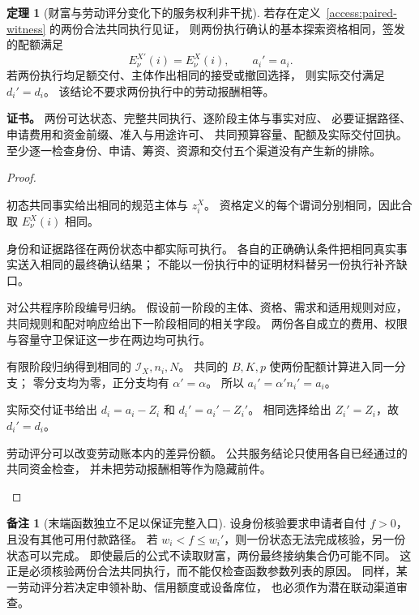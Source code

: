 \documentclass[UTF8,12pt,a4paper,openany,fontset=none,zihao=false]{ctexrep}
\theoremstyle{definition}
\newtheorem{theorem}{定理}[chapter]
\newtheorem{remark}{备注}[chapter]
\newenvironment{certificate}{\par\noindent\textbf{证书。}\ignorespaces}{\par}
\newcommand{\1}{\mathbf 1}
\begin{document}
\begin{theorem}[财富与劳动评分变化下的服务权利非干扰]
\label{access:noninterference}
若存在定义~\ref{access:paired-witness} 的两份合法共同执行见证，
则两份执行确认的基本探索资格相同，签发的配额满足
\[
E_\nu^{X\prime}(i)=E_\nu^X(i),\qquad a_i'=a_i.
\]
若两份执行均足额交付、主体作出相同的接受或撤回选择，
则实际交付满足 \(d_i'=d_i\)。
该结论不要求两份执行中的劳动报酬相等。
\end{theorem}
\begin{certificate}
两份可达状态、完整共同执行、逐阶段主体与事实对应、
必要证据路径、申请费用和资金前缀、准入与用途许可、
共同预算容量、配额及实际交付回执。
至少逐一检查身份、申请、筹资、资源和交付五个渠道没有产生新的排除。
\end{certificate}
\begin{proof}
\begin{semanticsteps}
\item 初态共同事实给出相同的规范主体与 \(z_i^X\)。
资格定义的每个谓词分别相同，因此合取 \(E_\nu^X(i)\) 相同。
\item 身份和证据路径在两份状态中都实际可执行。
各自的正确确认条件把相同真实事实送入相同的最终确认结果；
不能以一份执行中的证明材料替另一份执行补齐缺口。
\item 对公共程序阶段编号归纳。
假设前一阶段的主体、资格、需求和适用规则对应，
共同规则和配对响应给出下一阶段相同的相关字段。
两份各自成立的费用、权限与容量守卫保证这一步在两边均可执行。
\item 有限阶段归纳得到相同的 \(\mathcal I_X,n_i,N\)。
共同的 \(B,K,p\) 使两份配额计算进入同一分支；
零分支均为零，正分支均有 \(\alpha'=\alpha\)。
所以 \(a_i'=\alpha'n_i'=a_i\)。
\item 实际交付证书给出
\(d_i=a_i-Z_i\) 和 \(d_i'=a_i'-Z_i'\)。
相同选择给出 \(Z_i'=Z_i\)，故 \(d_i'=d_i\)。
\item 劳动评分可以改变劳动账本内的差异份额。
公共服务结论只使用各自已经通过的共同资金检查，
并未把劳动报酬相等作为隐藏前件。
\end{semanticsteps}
\end{proof}

\begin{remark}[末端函数独立不足以保证完整入口]
设身份核验要求申请者自付 \(f>0\)，且没有其他可用付款路径。
若 \(w_i<f\le w_i'\)，则一份状态无法完成核验，另一份状态可以完成。
即使最后的公式不读取财富，两份最终接纳集合仍可能不同。
这正是必须核验两份合法共同执行，而不能仅检查函数参数列表的原因。
同样，某一劳动评分若决定申领补助、信用额度或设备席位，
也必须作为潜在联动渠道审查。
\end{remark}
\end{document}
